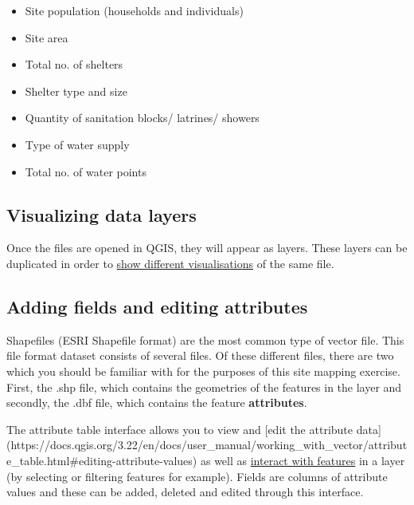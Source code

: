 \documentclass[
  a4paper,
  onecolumn,
  oneside]{book}
\providecommand{\tightlist}{%
  \setlength{\itemsep}{0pt}\setlength{\parskip}{0pt}}\usepackage{longtable,booktabs,array}
\begin{document}
\begin{itemize}
\begin{itemize}
    \begin{itemize}
    \tightlist
    \item
      Site population (households and individuals)
    \item
      Site area
    \item
      Total no. of shelters
    \item
      Shelter type and size
    \item
      Quantity of sanitation blocks/ latrines/ showers
    \item
      Type of water supply
    \item
      Total no. of water points
    \end{itemize}
  \end{itemize}
\end{itemize}

\hypertarget{visualizing-data-layers}{%
\subsection{Visualizing data layers}\label{visualizing-data-layers}}

Once the files are opened in QGIS, they will appear as layers. These
layers can be duplicated in order to
\href{https://docs.qgis.org/3.22/en/docs/user_manual/style_library/symbol_selector.html\#the-symbol-selector}{show
different visualisations} of the same file.

\hypertarget{adding-fields-and-editing-attributes}{%
\subsection{Adding fields and editing
attributes}\label{adding-fields-and-editing-attributes}}

Shapefiles (ESRI Shapefile format) are the most common type of vector
file. This file format dataset consists of several files. Of these
different files, there are two which you should be familiar with for the
purposes of this site mapping exercise. First, the .shp file, which
contains the geometries of the features in the layer and secondly, the
.dbf file, which contains the feature \textbf{attributes}.

The attribute table interface allows you to view and {[}edit the
attribute data{]}
(https://docs.qgis.org/3.22/en/docs/user\_manual/working\_with\_vector/attribute\_table.html\#editing-attribute-values)
as well as
\href{https://docs.qgis.org/3.22/en/docs/user_manual/working_with_vector/attribute_table.html\#interacting-with-features-in-an-attribute-table}{interact
with features} in a layer (by selecting or filtering features for
example). Fields are columns of attribute values and these can be added,
deleted and edited through this interface.
\end{document}
